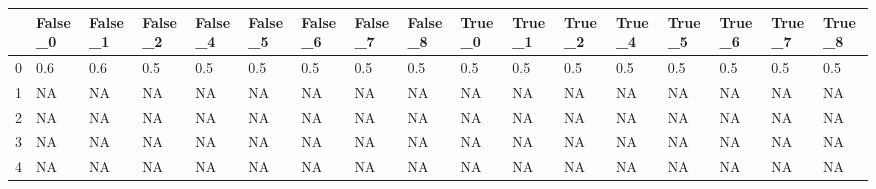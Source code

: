 \begin{tabular}{lllllllllllllllll}
\toprule
{} & False\_0 & False\_1 & False\_2 & False\_4 & False\_5 & False\_6 & False\_7 & False\_8 & True\_0 & True\_1 & True\_2 & True\_4 & True\_5 & True\_6 & True\_7 & True\_8 \\ \hline
\midrule
0 &     0.6 &     0.6 &     0.5 &     0.5 &     0.5 &     0.5 &     0.5 &     0.5 &    0.5 &    0.5 &    0.5 &    0.5 &    0.5 &    0.5 &    0.5 &    0.5 \\ \hline
1 &      NA &      NA &      NA &      NA &      NA &      NA &      NA &      NA &     NA &     NA &     NA &     NA &     NA &     NA &     NA &     NA \\ \hline
2 &      NA &      NA &      NA &      NA &      NA &      NA &      NA &      NA &     NA &     NA &     NA &     NA &     NA &     NA &     NA &     NA \\ \hline
3 &      NA &      NA &      NA &      NA &      NA &      NA &      NA &      NA &     NA &     NA &     NA &     NA &     NA &     NA &     NA &     NA \\ \hline
4 &      NA &      NA &      NA &      NA &      NA &      NA &      NA &      NA &     NA &     NA &     NA &     NA &     NA &     NA &     NA &     NA \\ \hline
\bottomrule
\end{tabular}
